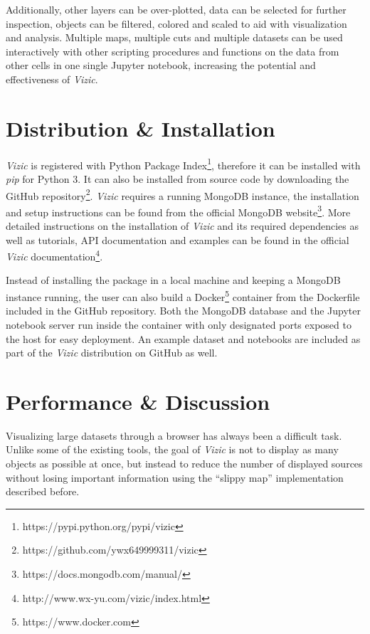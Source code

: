 \documentclass[5p,authoryear]{elsarticle}
\begin{document}
Additionally, other layers can be over-plotted, data can be selected for further inspection, objects can be filtered, colored and scaled to aid with visualization and analysis.
Multiple maps, multiple cuts and multiple datasets can be used interactively with other scripting  procedures and functions on the data from other cells in one single Jupyter notebook, increasing the potential and effectiveness of \textit{Vizic}.

\section{Distribution \& Installation}
\label{install}
\textit{Vizic} is registered with Python Package Index\footnote{https://pypi.python.org/pypi/vizic}, therefore it can be installed with \textit{pip} for Python 3.
It can also be installed from source code by downloading the GitHub repository\footnote{https://github.com/ywx649999311/vizic}.
\textit{Vizic} requires a running MongoDB instance, the installation and setup instructions can be found from the official MongoDB website\footnote{https://docs.mongodb.com/manual/}.
More detailed instructions on the installation of \textit{Vizic} and its required dependencies as well as tutorials, API documentation and examples can be found in the official \textit{Vizic} documentation\footnote{http://www.wx-yu.com/vizic/index.html}.

Instead of installing the package in a local machine and keeping a MongoDB instance running, the user can also build a Docker\footnote{https://www.docker.com} container from the Dockerfile included in the GitHub repository.
Both the MongoDB database and the Jupyter notebook server run inside the container with only designated ports exposed to the host for easy deployment.
An example dataset and notebooks are included as part of the \textit{Vizic} distribution on GitHub as well.

\section{Performance \& Discussion}
\label{performance}

Visualizing large datasets through a browser has always been a difficult task. Unlike some of the existing tools, the goal of \textit{Vizic} is not to display as many objects as possible at once, but instead to reduce the number of displayed sources without losing important information using the ``slippy map'' implementation described before.
\end{document}
